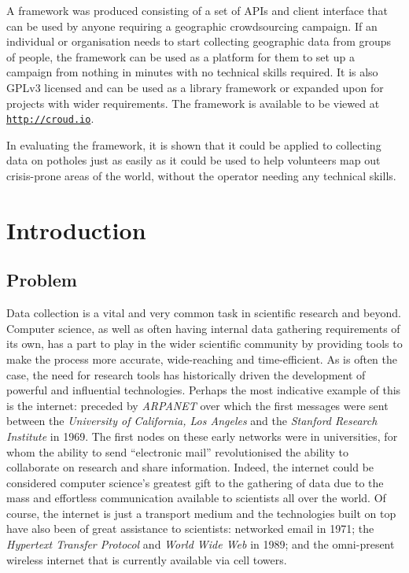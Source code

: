 \documentclass{article}
\newcommand\ssection{\clearpage\section}
\begin{document}
		A framework was produced consisting of a set of APIs and client interface that can be used by anyone requiring a geographic crowdsourcing campaign. If an individual or organisation needs to start collecting geographic data from groups of people, the framework can be used as a platform for them to set up a campaign from nothing in minutes with no technical skills required. It is also GPLv3 licensed and can be used as a library framework or expanded upon for projects with wider requirements. The framework is available to be viewed at \href{http://croud.io}{\nolinkurl{http://croud.io}}.

		In evaluating the framework, it is shown that it could be applied to collecting data on potholes just as easily as it could be used to help volunteers map out crisis-prone areas of the world, without the operator needing any technical skills.

	\ssection{Introduction}
	\label{sec:introduction}
		\subsection{Problem}
		Data collection is a vital and very common task in scientific research and beyond. Computer science, as well as often having internal data gathering requirements of its own, has a part to play in the wider scientific community by providing tools to make the process more accurate, wide-reaching and time-efficient. As is often the case, the need for research tools has historically driven the development of powerful and influential technologies\cite{haggerty_spinoff_1991}. Perhaps the most indicative example of this is the internet: preceded by \emph{ARPANET} over which the first messages were sent between the \emph{University of California, Los Angeles} and the \emph{Stanford Research Institute} in 1969\cite{_arpanet_????}. The first nodes on these early networks were in universities, for whom the ability to send ``electronic mail'' revolutionised the ability to collaborate on research and share information\cite{benfield_internet-based_2006}. Indeed, the internet could be considered computer science's greatest gift to the gathering of data due to the mass and effortless communication available to scientists all over the world\cite{benfield_internet-based_2006}. Of course, the internet is just a transport medium and the technologies built on top have also been of great assistance to scientists: networked email in 1971\cite{_first_????}; the \emph{Hypertext Transfer Protocol} and \emph{World Wide Web} in 1989\cite{_http_????}; and the omni-present wireless internet that is currently available via cell towers.
\end{document}
